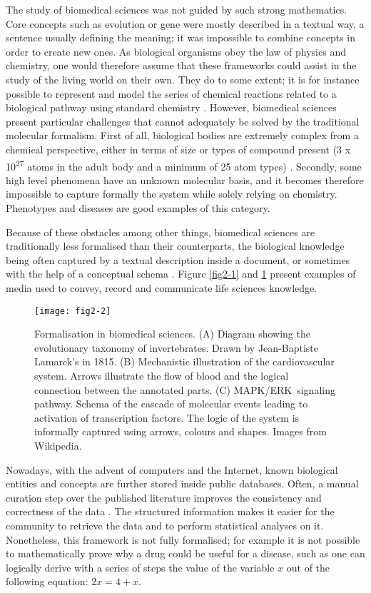 The study of biomedical sciences was not guided by such strong mathematics. Core concepts such as evolution or gene were mostly described in a textual way, a sentence usually defining the meaning; it was impossible to combine concepts in order to create new ones. As biological organisms obey the law of physics and chemistry, one would therefore assume that these frameworks could assist in the study of the living world on their own. They do to some extent; it is for instance possible to represent and model the series of chemical reactions related to a biological pathway using standard chemistry \citep{le2006biomodels}. However, biomedical sciences present particular challenges that cannot adequately be solved by the traditional molecular formalism. First of all, biological bodies are extremely complex from a chemical perspective, either in terms of size or types of compound present (3 x 10\textsuperscript{27} atoms in the adult body and a minimum of 25 atom types) \citep{nielsen1999ultratrace}. Secondly, some high level phenomena have an unknown molecular basis, and it becomes therefore impossible to capture formally the system while solely relying on chemistry. Phenotypes and diseases are good examples of this category.

Because of these obstacles among other things, biomedical sciences are traditionally less formalised than their counterparts, the biological knowledge being often captured by a textual description inside a document, or sometimes with the help of a conceptual schema \citep{lazebnik2002can}. Figure \ref{fig2-1} and \ref{fig2-2} present examples of media used to convey, record and communicate life sciences knowledge.

\begin{figure}[ht]
    \centering
    \texttt{[image: fig2-2]}
    \caption{Formalisation in biomedical sciences. (A) Diagram showing the evolutionary taxonomy of invertebrates. Drawn by Jean-Baptiste Lamarck's in 1815. (B) Mechanistic illustration of the cardiovascular system. Arrows illustrate the flow of blood and the logical connection between the annotated parts. (C) MAPK/ERK signaling pathway. Schema of the cascade of molecular events leading to activation of transcription factors. The logic of the system is informally captured using arrows, colours and shapes. Images from Wikipedia.}
    \label{fig2-2}
\end{figure}

Nowadays, with the advent of computers and the Internet, known biological entities and concepts are further stored inside public databases. Often, a manual curation step over the published literature improves the consistency and correctness of the data \citep{brooksbank2014european}. The structured information makes it easier for the community to retrieve the data and to perform statistical analyses on it. Nonetheless, this framework is not fully formalised; for example it is not possible to mathematically prove why a drug could be useful for a disease, such as one can logically derive with a series of steps the value of the variable $ x $ out of the following equation: $ 2x = 4 + x $.

